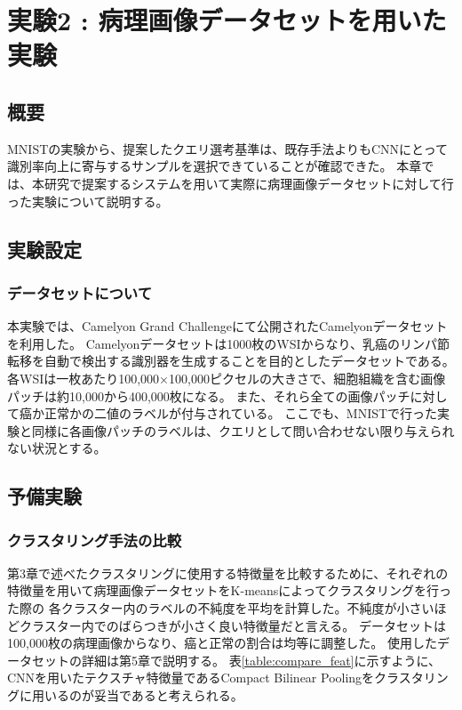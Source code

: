 \chapter{実験2 : 病理画像データセットを用いた実験}
\section{概要}
MNISTの実験から、提案したクエリ選考基準は、既存手法よりもCNNにとって識別率向上に寄与するサンプルを選択できていることが確認できた。
本章では、本研究で提案するシステムを用いて実際に病理画像データセットに対して行った実験について説明する。

\section{実験設定}
\subsection{データセットについて}
本実験では、Camelyon Grand Challenge\cite{Camelyon17}にて公開されたCamelyonデータセットを利用した。
Camelyonデータセットは1000枚のWSIからなり、乳癌のリンパ節転移を自動で検出する識別器を生成することを目的としたデータセットである。
各WSIは一枚あたり100,000×100,000ピクセルの大きさで、細胞組織を含む画像パッチは約10,000から400,000枚になる。
また、それら全ての画像パッチに対して癌か正常かの二値のラベルが付与されている。
ここでも、MNISTで行った実験と同様に各画像パッチのラベルは、クエリとして問い合わせない限り与えられない状況とする。

\section{予備実験}

\subsection{クラスタリング手法の比較}
第3章で述べたクラスタリングに使用する特徴量を比較するために、それぞれの特徴量を用いて病理画像データセットをK-meansによってクラスタリングを行った際の
各クラスター内のラベルの不純度を平均を計算した。不純度が小さいほどクラスター内でのばらつきが小さく良い特徴量だと言える。
データセットは100,000枚の病理画像からなり、癌と正常の割合は均等に調整した。
使用したデータセットの詳細は第5章で説明する。
表\ref{table:compare_feat}に示すように、CNNを用いたテクスチャ特徴量であるCompact Bilinear Poolingをクラスタリングに用いるのが妥当であると考えられる。

